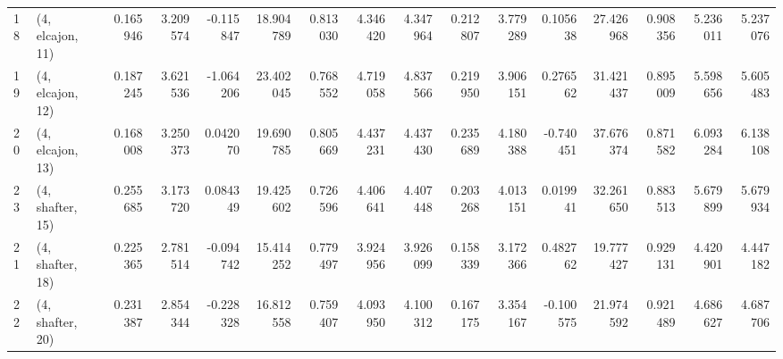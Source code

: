 \begin{tabular}{llrrrrrrrrrrrrrr}
18 &  (4, elcajon, 11) &   0.165946 &  3.209574 & -0.115847 &  18.904789 &  0.813030 &   4.346420 &  4.347964 &  0.212807 &  3.779289 &  0.105638 &   27.426968 &  0.908356 &   5.236011 &   5.237076 \\
19 &  (4, elcajon, 12) &   0.187245 &  3.621536 & -1.064206 &  23.402045 &  0.768552 &   4.719058 &  4.837566 &  0.219950 &  3.906151 &  0.276562 &   31.421437 &  0.895009 &   5.598656 &   5.605483 \\
20 &  (4, elcajon, 13) &   0.168008 &  3.250373 &  0.042070 &  19.690785 &  0.805669 &   4.437231 &  4.437430 &  0.235689 &  4.180388 & -0.740451 &   37.676374 &  0.871582 &   6.093284 &   6.138108 \\
23 &  (4, shafter, 15) &   0.255685 &  3.173720 &  0.084349 &  19.425602 &  0.726596 &   4.406641 &  4.407448 &  0.203268 &  4.013151 &  0.019941 &   32.261650 &  0.883513 &   5.679899 &   5.679934 \\
21 &  (4, shafter, 18) &   0.225365 &  2.781514 & -0.094742 &  15.414252 &  0.779497 &   3.924956 &  3.926099 &  0.158339 &  3.172366 &  0.482762 &   19.777427 &  0.929131 &   4.420901 &   4.447182 \\
22 &  (4, shafter, 20) &   0.231387 &  2.854344 & -0.228328 &  16.812558 &  0.759407 &   4.093950 &  4.100312 &  0.167175 &  3.354167 & -0.100575 &   21.974592 &  0.921489 &   4.686627 &   4.687706 \\
\bottomrule
\end{tabular}

